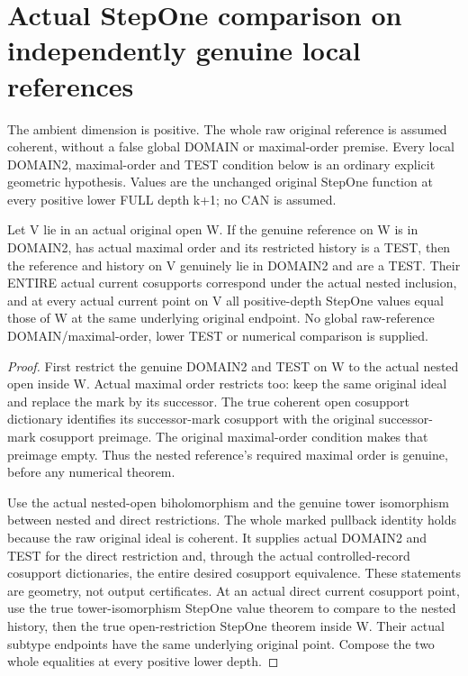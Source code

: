 \section{Actual StepOne comparison on independently genuine local references}

The ambient dimension is positive. The whole raw original reference is
assumed coherent, without a false global DOMAIN or maximal-order premise.
Every local DOMAIN2, maximal-order and TEST condition below is an ordinary
explicit geometric hypothesis. Values are the unchanged original StepOne
function at every positive lower FULL depth k+1; no CAN is assumed.

\begin{theorem}
\label{hir:original-bound-two-stepone-locally-domain-nested-open}
\leanok
Let V lie in an actual original open W. If the genuine reference on W is
in DOMAIN2, has actual maximal order and its restricted history is a TEST,
then the reference and history on V genuinely lie in DOMAIN2 and are a
TEST. Their ENTIRE actual current cosupports correspond under the actual
nested inclusion, and at every actual current point on V all positive-depth
StepOne values equal those of W at the same underlying original endpoint.
No global raw-reference DOMAIN/maximal-order, lower TEST or numerical
comparison is supplied.
\end{theorem}
\begin{proof}
First restrict the genuine DOMAIN2 and TEST on W to the actual nested open
inside W. Actual maximal order restricts too: keep the same original ideal
and replace the mark by its successor. The true coherent open cosupport
dictionary identifies its successor-mark cosupport with the original
successor-mark cosupport preimage. The original maximal-order condition
makes that preimage empty. Thus the nested reference's required maximal
order is genuine, before any numerical theorem.

Use the actual nested-open biholomorphism and the genuine tower
isomorphism between nested and direct restrictions. The whole marked
pullback identity holds because the raw original ideal is coherent. It
supplies actual DOMAIN2 and TEST for the direct restriction and, through
the actual controlled-record cosupport dictionaries, the entire desired
cosupport equivalence. These statements are geometry, not output
certificates. At an actual direct current cosupport point, use the true
tower-isomorphism StepOne value theorem to compare to the nested history,
then the true open-restriction StepOne theorem inside W. Their actual
subtype endpoints have the same underlying original point. Compose the
two whole equalities at every positive lower depth.
\end{proof}

